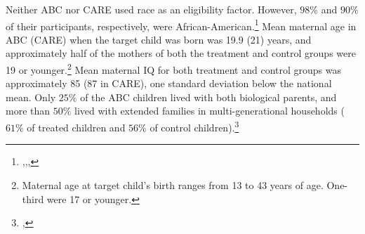 \noindent Neither ABC nor CARE used race as an eligibility factor. However, $98\%$ and $90\%$ of their participants, respectively, were African-American.\footnote{\citet{Ramey_Smith_1977_AJMD},\citet{Ramey_Campbell_1984_AJMD},\citet{Ramey_Campbell_1991_childreninpoverty},\citet{Campbell_Pungello_etal_2001_DP}} Mean maternal age in ABC (CARE) when the target child was born was 19.9 (21) years, and approximately half of the mothers of both the treatment and control groups were 19 or younger.\footnote{Maternal age at target child’s birth ranges from 13 to 43 years of age. One-third were 17 or younger.} Mean maternal IQ for both treatment and control groups was approximately 85 (87 in CARE), one standard deviation below the national mean. Only $25\%$ of the ABC children lived with both biological parents, and more than $50\%$ lived with extended families in multi-generational households ($61\%$ of treated children and $56\%$ of control children).\footnote{\citet{Ramey_Campbell_1991_childreninpoverty},\citet{Campbell_Ramey_1994_CD}}\\

